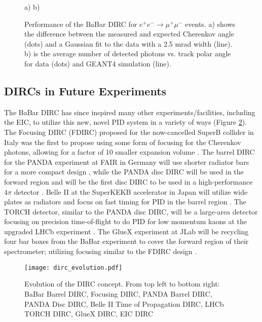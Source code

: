 \begin{figure}[!htb]
	\centering
	a)%
	b)%
	\caption{Performance of the BaBar DIRC for $e^{+}e^{-} \rightarrow \mu^{+}\mu^{-}$ events. a) shows the difference between the measured and expected Cherenkov angle (dots) and a Gaussian fit to the data with a 2.5 mrad width (line). b) is the average number of detected photons vs. track polar angle for data (dots) and GEANT4 \cite{GEANT4} simulation (line).}
	\label{fig:babarperformance}
\end{figure}

\subsection{DIRCs in Future Experiments}
The BaBar DIRC has since inspired many other experiments/facilities, including the EIC, to utilize this new, novel PID system in a variety of ways (Figure \ref{fig:dirc_evolution}). The Focusing DIRC (FDIRC) proposed for the now-cancelled SuperB collider in Italy was the first to propose using some form of focusing for the Cherenkov photons, allowing for a factor of 10 smaller expansion volume \cite{FDIRC}. The barrel DIRC for the PANDA experiment at FAIR in Germany will use shorter radiator bars for a more compact design \cite{PANDA_barrel}, while the PANDA disc DIRC will be used in the forward region and will be the first disc DIRC to be used in a high-performance $4\pi$ detector \cite{PANDA_disc}. Belle II at the SuperKEKB accelerator in Japan will utilize wide plates as radiators and focus on fast timing for PID in the barrel region \cite{Belle2_TOP}. The TORCH detector, similar to the PANDA disc DIRC, will be a large-area detector focusing on precision time-of-flight to do PID for low momentum kaons at the upgraded LHCb experiment \cite{TORCH}. The GlueX experiment at JLab will be recycling four bar boxes from the BaBar experiment to cover the forward region of their spectrometer; utilizing  focusing similar to the FDIRC design \cite{GlueX}.

\begin{figure}[H]
	\centering
	\texttt{[image: dirc\_evolution.pdf]}
	\caption{Evolution of the DIRC concept. From top left to bottom right: BaBar Barrel DIRC, Focusing DIRC, PANDA Barrel DIRC, PANDA Disc DIRC, Belle II Time of Propagation DIRC, LHCb TORCH DIRC, GlueX DIRC, EIC DIRC}
	\label{fig:dirc_evolution}
\end{figure}


